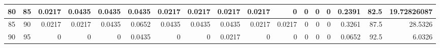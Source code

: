 \begin{table}[hb]
\begin{adjustbox}{width = \textwidth, center}
\begin{tabular}{|cc|r|r|r|r|r|r|r|r|r|r|r|r|r|r|r|}
            \cellcolor[HTML]{C8E4BE}80             & \cellcolor[HTML]{D9EAD3}85             & \cellcolor[HTML]{C7E9D8}0.0217                 & \cellcolor[HTML]{8FD2B1}0.0435                 & \cellcolor[HTML]{8FD2B1}0.0435                 & \cellcolor[HTML]{8FD2B1}0.0435                 & \cellcolor[HTML]{C7E9D8}0.0217                 & \cellcolor[HTML]{C7E9D8}0.0217                 & \cellcolor[HTML]{C7E9D8}0.0217                 & \cellcolor[HTML]{C7E9D8}0.0217                  & \cellcolor[HTML]{FFFFFF}0                       & \cellcolor[HTML]{FFFFFF}0                       & \cellcolor[HTML]{FFFFFF}0                       & \cellcolor[HTML]{FFFFFF}0                       & \cellcolor[HTML]{D9D2E9}0.2391                                                  & \cellcolor[HTML]{D9D2E9}82.5                                            & \cellcolor[HTML]{D9D2E9}19.72826087                                                              \\ \hline
            \cellcolor[HTML]{C8E4BE}85             & \cellcolor[HTML]{D9EAD3}90             & \cellcolor[HTML]{C7E9D8}0.0217                 & \cellcolor[HTML]{C7E9D8}0.0217                 & \cellcolor[HTML]{8FD2B1}0.0435                 & \cellcolor[HTML]{57BB8A}0.0652                 & \cellcolor[HTML]{8FD2B1}0.0435                 & \cellcolor[HTML]{8FD2B1}0.0435                 & \cellcolor[HTML]{8FD2B1}0.0435                 & \cellcolor[HTML]{C7E9D8}0.0217                  & \cellcolor[HTML]{C7E9D8}0.0217                  & \cellcolor[HTML]{FFFFFF}0                       & \cellcolor[HTML]{FFFFFF}0                       & \cellcolor[HTML]{FFFFFF}0                       & \cellcolor[HTML]{D9D2E9}0.3261                                                  & \cellcolor[HTML]{D9D2E9}87.5                                            & \cellcolor[HTML]{D9D2E9}28.5326                                                                  \\ \hline
            \rowcolor[HTML]{FFFFFF} 
            \cellcolor[HTML]{C8E4BE}90             & \cellcolor[HTML]{D9EAD3}95             & 0                                              & 0                                              & 0                                              & \cellcolor[HTML]{8FD2B1}0.0435                 & 0                                              & 0                                              & \cellcolor[HTML]{C7E9D8}0.0217                 & 0                                               & 0                                               & 0                                               & 0                                               & 0                                               & \cellcolor[HTML]{D9D2E9}0.0652                                                  & \cellcolor[HTML]{D9D2E9}92.5                                            & \cellcolor[HTML]{D9D2E9}6.0326                                                                   \\ \hline

\end{tabular}
\end{adjustbox}
\end{table}
